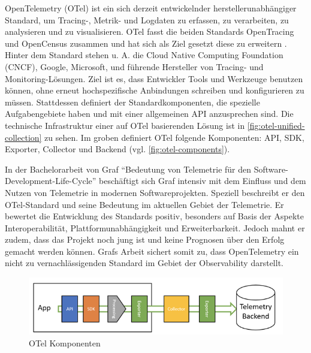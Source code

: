 OpenTelemetry (OTel) \cite{OpenTelemetry} ist ein sich derzeit\footnotemark{} entwickelnder herstellerunabhängiger Standard, um Tracing-, Metrik- und Logdaten\footnotemark{} zu erfassen, zu verarbeiten, zu analysieren und zu visualisieren. OTel fasst die beiden Standards OpenTracing und OpenCensus \cite{OpenCensus} zusammen und hat sich als Ziel gesetzt diese zu erweitern \cite{UseNixDistributiveTracing}. Hinter dem Standard stehen u. A. die Cloud Native Computing Foundation (CNCF), Google, Microsoft, und führende Hersteller von Tracing- und Monitoring-Lösungen. Ziel ist es, dass Entwickler Tools und Werkzeuge benutzen können, ohne erneut hochspezifische Anbindungen schreiben und konfigurieren zu müssen. Stattdessen definiert der Standardkomponenten, die spezielle Aufgabengebiete haben und mit einer allgemeinen API anzusprechen sind. Die technische Infrastruktur einer auf OTel basierenden Lösung ist in \autoref{fig:otel-unified-collection} zu sehen. Im groben definiert OTel folgende Komponenten: API, SDK, Exporter, Collector und Backend (vgl. \autoref{fig:otel-components}).

In der Bachelorarbeit von Graf \enquote{Bedeutung von Telemetrie für den Software-Development-Life-Cycle} \cite{MichaelGrafBA} beschäftigt sich Graf intensiv mit dem Einfluss und dem Nutzen von Telemetrie in modernen Softwareprojekten. Speziell beschreibt er den OTel-Standard und seine Bedeutung im aktuellen Gebiet der Telemetrie. Er bewertet die Entwicklung des Standards positiv, besonders auf Basis der Aspekte Interoperabilität, Plattformunabhängigkeit und Erweiterbarkeit. Jedoch mahnt er zudem, dass das Projekt noch jung ist und keine Prognosen über den Erfolg gemacht werden können. Grafs Arbeit sichert somit zu, dass OpenTelemetry ein nicht zu vernachlässigenden Standard im Gebiet der Observability darstellt.


\begin{figure}[H]
	\centering
	\includegraphics[width=0.55\linewidth]{img/03_methoden/dynatrace_otel-components.png}
	\caption{OTel Komponenten \cite{DynatraceOTelComponents}}
	\label{fig:otel-components}
\end{figure}

